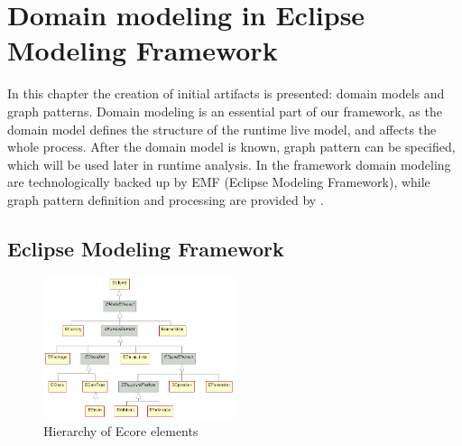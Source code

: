 \chapter{Domain modeling in Eclipse Modeling Framework}
\label{chapter:emf}

In this chapter the creation of initial artifacts is presented: domain models and graph patterns.
Domain modeling is an essential part of our framework, as the domain model defines the structure of the runtime live model, and affects the whole process. 
After the domain model is known, graph pattern can be specified, which will be used later in runtime analysis.
In the framework domain modeling are technologically backed up by EMF (Eclipse Modeling Framework), 
while graph pattern definition and processing are provided by \viatra{}.

\section{Eclipse Modeling Framework}


\begin{figure}
	\begin{center}
		\includegraphics[width=0.5\textwidth]{figures/EcoreHierarchy.png}
		\caption{Hierarchy of Ecore elements \cite{ecore-package} }
		\label{fig:ecore-hierarchy}
	\end{center}
\end{figure}

